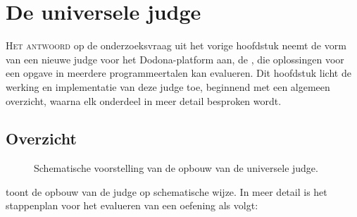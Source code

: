 \chapter{De universele judge}\label{ch:de-universele-judge}

\lettrine{H}{et antwoord} op de onderzoeksvraag uit het vorige hoofdstuk neemt de vorm van een nieuwe judge voor het Dodona-platform aan, de , die oplossingen voor een opgave in meerdere programmeertalen kan evalueren.
Dit hoofdstuk licht de werking en implementatie van deze judge toe, beginnend met een algemeen overzicht, waarna elk onderdeel in meer detail besproken wordt.

\section{Overzicht}\label{sec:overzicht}

\begin{figure}
    \begin{adjustbox}{width=\textwidth}
        
    \end{adjustbox}
    \caption{Schematische voorstelling van de opbouw van de universele judge.}
    \label{fig:universal-judge}
\end{figure}

 toont de opbouw van de judge op schematische wijze.
In meer detail is het stappenplan voor het evalueren van een oefening als volgt:

